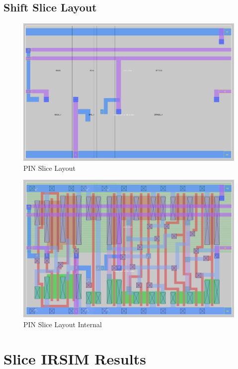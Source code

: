     \subsection{Shift Slice Layout}
        \begin{figure}[H]
            \centering
            \includegraphics[width=0.75\linewidth]{../../magic/images/shift_slice.png}
            \caption{PIN Slice Layout}
        \end{figure}
        \begin{figure}[H]
            \centering
            \includegraphics[width=0.75\linewidth]{../../magic/images/shift_slice_internal.png}
            \caption{PIN Slice Layout Internal}
        \end{figure}

\newpage
\section{Slice IRSIM Results}
